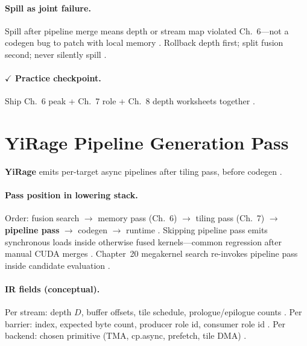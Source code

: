 \paragraph{Spill as joint failure.}
Spill after pipeline merge means depth or stream map violated Ch.~6---not a codegen bug to patch with local memory \citep{memoryfloor2026,dao2022flashattention,yirage2026}.
Rollback depth first; split fusion second; never silently spill \citep{chen2020compilerbasedhardw,wu2024mirage}.

\paragraph{$\checkmark$ Practice checkpoint.}
Ship Ch.~6 peak + Ch.~7 role + Ch.~8 depth worksheets together \citep{chen2020compilerbasedhardw,taxbreak2026}.

\section{YiRage Pipeline Generation Pass}
\label{sec:ch08_yirage_pipeline_gen}

\textbf{YiRage} emits per-target async pipelines after tiling pass, before codegen \citep{yirage2026,shah2024flashattention3,wu2024mirage}.

\paragraph{Pass position in lowering stack.}
Order: fusion search $\rightarrow$ memory pass (Ch.~6) $\rightarrow$ tiling pass (Ch.~7) $\rightarrow$ \textbf{pipeline pass} $\rightarrow$ codegen $\rightarrow$ runtime \citep{yirage2026,wu2024mirage,mpk2025,chen2020compilerbasedhardw}.
Skipping pipeline pass emits synchronous loads inside otherwise fused kernels---common regression after manual CUDA merges \citep{shah2024flashattention3,taxbreak2026,patel2025llminference}.
Chapter~20 megakernel search re-invokes pipeline pass inside candidate evaluation \citep{mpk2025,wu2024mirage,yirage2026}.

\paragraph{IR fields (conceptual).}
Per stream: depth $D$, buffer offsets, tile schedule, prologue/epilogue counts \citep{yirage2026,dao2022flashattention,semianalysis2024tma}.
Per barrier: index, expected byte count, producer role id, consumer role id \citep{shah2024flashattention3,nvidia2022hopper,chen2020compilerbasedhardw}.
Per backend: chosen primitive (TMA, cp.async, prefetch, tile DMA) \citep{amd2024xdna,dlbook,patel2025llminference}.

